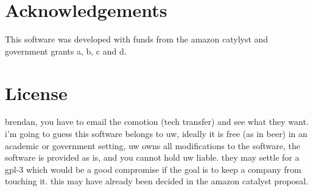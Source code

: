 \documentclass[12pt]{article}
\begin{document}
\section{Acknowledgements}
This software was developed with funds from the amazon catylyst and government grants a, b, c and d.  

\appendix
\section{License}\label{s:license}
brendan, you have to email the comotion (tech transfer) and see what they want.  
i'm going to guess this software belongs to uw, ideally it is free (as in beer) in
an academic or government setting, uw owns all modifications to the software, the software
is provided as is, and you cannot hold uw liable.  they may settle for a gpl-3 which would 
be a good compromise if the goal is to keep a company from touching it.  this may have
already been decided in the amazon catalyst proposal. 
\end{document}
